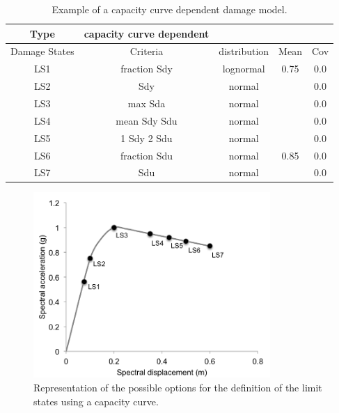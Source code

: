 \begin {table}[htb]
\caption{Example of a capacity curve dependent damage model.}
\label{table:cc-dmg}
\begin{center}
  \begin{tabular}{ | c | c | c | c | c |}
  \hline
    Type & capacity curve dependent &  &  & \\ \hline
    Damage States & Criteria & distribution & Mean & Cov \\ \hline
    LS1 & fraction Sdy & lognormal & 0.75 & 0.0 \\ \hline
    LS2 & Sdy & normal &  & 0.0 \\ \hline
    LS3 & max Sda & normal &  & 0.0 \\ \hline
    LS4 & mean Sdy Sdu & normal &  & 0.0 \\ \hline
    LS5 & 1 Sdy 2 Sdu & normal &  & 0.0 \\ \hline
    LS6 & fraction Sdu & normal & 0.85 & 0.0 \\ \hline
    LS7 & Sdu & normal &  & 0.0 \\ \hline
  \end{tabular}
\end{center}
\end{table}

\begin{figure}[htb]
  \centering
      \includegraphics[width=9cm]{figures/cc_damage_model.png}
  \caption{Representation of the possible options for the definition of the limit states using a capacity curve.}
  \label{fig:cc-dmg}
\end{figure}

